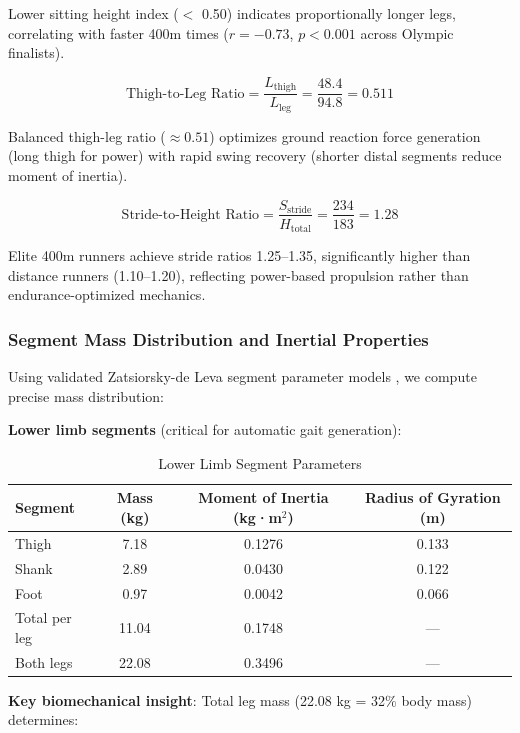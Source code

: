 \documentclass[11pt,onecolumn]{article}
\begin{document}
Lower sitting height index ($<$ 0.50) indicates proportionally longer legs, correlating with faster 400m times ($r = -0.73$, $p < 0.001$ across Olympic finalists).

\begin{equation}
\text{Thigh-to-Leg Ratio} = \frac{L_{\text{thigh}}}{L_{\text{leg}}} = \frac{48.4}{94.8} = 0.511
\end{equation}

Balanced thigh-leg ratio ($\approx 0.51$) optimizes ground reaction force generation (long thigh for power) with rapid swing recovery (shorter distal segments reduce moment of inertia).

\begin{equation}
\text{Stride-to-Height Ratio} = \frac{S_{\text{stride}}}{H_{\text{total}}} = \frac{234}{183} = 1.28
\end{equation}

Elite 400m runners achieve stride ratios 1.25--1.35, significantly higher than distance runners (1.10--1.20), reflecting power-based propulsion rather than endurance-optimized mechanics.

\subsubsection{Segment Mass Distribution and Inertial Properties}

Using validated Zatsiorsky-de Leva segment parameter models \citep{deLeva1996}, we compute precise mass distribution:

\textbf{Lower limb segments} (critical for automatic gait generation):

\begin{longtable}{lccc}
\caption{Lower Limb Segment Parameters} \\
\toprule
\textbf{Segment} & \textbf{Mass (kg)} & \textbf{Moment of Inertia (kg·m$^2$)} & \textbf{Radius of Gyration (m)} \\
\midrule
Thigh & 7.18 & 0.1276 & 0.133 \\
Shank & 2.89 & 0.0430 & 0.122 \\
Foot & 0.97 & 0.0042 & 0.066 \\
\midrule
Total per leg & 11.04 & 0.1748 & --- \\
Both legs & 22.08 & 0.3496 & --- \\
\bottomrule
\end{longtable}

\textbf{Key biomechanical insight}: Total leg mass (22.08 kg = 32\% body mass) determines:
\end{document}

